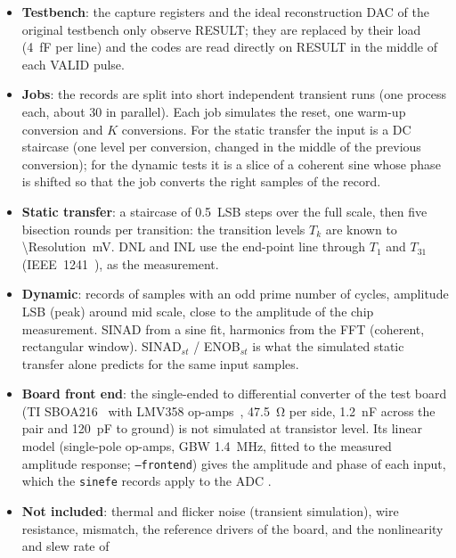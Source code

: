 \documentclass[10pt,a4paper]{article}
\begin{document}
\begin{itemize}
  \item \textbf{Testbench}: the capture registers and the ideal reconstruction DAC of the original
        testbench only observe RESULT; they are replaced by their load (\SI{4}{fF} per line) and the
        codes are read directly on RESULT in the middle of each VALID pulse.
  \item \textbf{Jobs}: the records are split into short independent transient runs (one process each,
        about 30 in parallel). Each job simulates the reset, one warm-up conversion and $K$ conversions.
        For the static transfer the input is a DC staircase (one level per conversion, changed in the
        middle of the previous conversion); for the dynamic tests it is a slice of a coherent sine whose
        phase is shifted so that the job converts the right samples of the record.
  \item \textbf{Static transfer}: a staircase of \SI{0.5}{LSB} steps over the full scale, then five
        bisection rounds per transition: the transition levels $T_k$ are known to
        \SI{\Resolution}{mV}. DNL and INL use the end-point line through $T_1$ and $T_{31}$ (IEEE~1241~\cite{ieee1241}), as the
        measurement.
  \item \textbf{Dynamic}: records of  samples with an odd prime number of cycles, amplitude
         LSB (peak) around mid scale, close to the amplitude of the chip measurement.
        SINAD from a sine fit, harmonics from the FFT (coherent, rectangular window).
        SINAD$_{st}$ / ENOB$_{st}$ is what the simulated static transfer alone predicts for the same
        input samples.
  \item \textbf{Board front end}: the single-ended to differential converter of the test board
        (TI SBOA216~\cite{sboa216} with LMV358 op-amps~\cite{lmv358}, \SI{47.5}{\ohm} per side,
        \SI{1.2}{nF} across the pair and \SI{120}{pF} to ground) is not simulated at transistor
        level. Its linear model (single-pole op-amps, GBW \SI{1.4}{MHz}, fitted to the measured
        amplitude response; \texttt{--frontend}) gives the amplitude and phase of each input,
        which the \texttt{sinefe} records apply to the ADC .
  \item \textbf{Not included}: thermal and flicker noise (transient simulation), wire resistance,
        mismatch, the reference drivers of the board, and the nonlinearity and slew rate of

\end{itemize}
\end{document}
